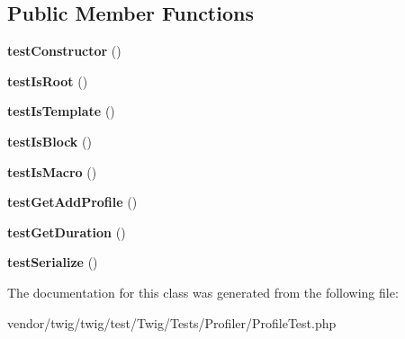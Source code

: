 \subsection*{Public Member Functions}
\begin{DoxyCompactItemize}
\item 
{\bfseries test\+Constructor} ()\hypertarget{classTwig__Tests__Profiler__ProfileTest_ae84315a0b0479171ffe572b2d5019b64}{}\label{classTwig__Tests__Profiler__ProfileTest_ae84315a0b0479171ffe572b2d5019b64}

\item 
{\bfseries test\+Is\+Root} ()\hypertarget{classTwig__Tests__Profiler__ProfileTest_adee1c731b28e4a62bfc7696b7325b817}{}\label{classTwig__Tests__Profiler__ProfileTest_adee1c731b28e4a62bfc7696b7325b817}

\item 
{\bfseries test\+Is\+Template} ()\hypertarget{classTwig__Tests__Profiler__ProfileTest_a940e58fca0ff4b2629875821b4e3035a}{}\label{classTwig__Tests__Profiler__ProfileTest_a940e58fca0ff4b2629875821b4e3035a}

\item 
{\bfseries test\+Is\+Block} ()\hypertarget{classTwig__Tests__Profiler__ProfileTest_ac8695e88a6900b5bf7e9dfd20d71db20}{}\label{classTwig__Tests__Profiler__ProfileTest_ac8695e88a6900b5bf7e9dfd20d71db20}

\item 
{\bfseries test\+Is\+Macro} ()\hypertarget{classTwig__Tests__Profiler__ProfileTest_aa025655a032ac2861402eac269164a71}{}\label{classTwig__Tests__Profiler__ProfileTest_aa025655a032ac2861402eac269164a71}

\item 
{\bfseries test\+Get\+Add\+Profile} ()\hypertarget{classTwig__Tests__Profiler__ProfileTest_a5e512072a2f6b492afe3f006f8ac462e}{}\label{classTwig__Tests__Profiler__ProfileTest_a5e512072a2f6b492afe3f006f8ac462e}

\item 
{\bfseries test\+Get\+Duration} ()\hypertarget{classTwig__Tests__Profiler__ProfileTest_ad7efbdbd8ce681c446b140603b78f890}{}\label{classTwig__Tests__Profiler__ProfileTest_ad7efbdbd8ce681c446b140603b78f890}

\item 
{\bfseries test\+Serialize} ()\hypertarget{classTwig__Tests__Profiler__ProfileTest_a57fa7b136a8b20ad58c31e73827f5476}{}\label{classTwig__Tests__Profiler__ProfileTest_a57fa7b136a8b20ad58c31e73827f5476}

\end{DoxyCompactItemize}


The documentation for this class was generated from the following file\+:\begin{DoxyCompactItemize}
\item 
vendor/twig/twig/test/\+Twig/\+Tests/\+Profiler/Profile\+Test.\+php\end{DoxyCompactItemize}
